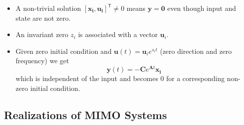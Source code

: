 
\begin{itemize}
    \item A non-trivial solution ${\left[\mathbf{x_i}, \mathbf{u_i}\right]}^\mathsf{T}\neq0$ means $\mathbf{\mathbf{y}}=\mathbf{0}$ even though input and state are not zero.
    \item An invariant zero $z_i$ is associated with a vector $\mathbf{u}_i$.
    \item Given zero initial condition and $\mathbf{u}(t)=\mathbf{u}_i e^{s_i t}$ (zero direction and zero frequency) we get
          \begin{equation*}
              \mathbf{y}(t)=-\mathbf{C}e^{\mathbf{A}t}\mathbf{x_i}
          \end{equation*} which is independent of the input and becomes $0$ for a corresponding non-zero initial condition.
\end{itemize}


\subsection{Realizations of MIMO Systems}
